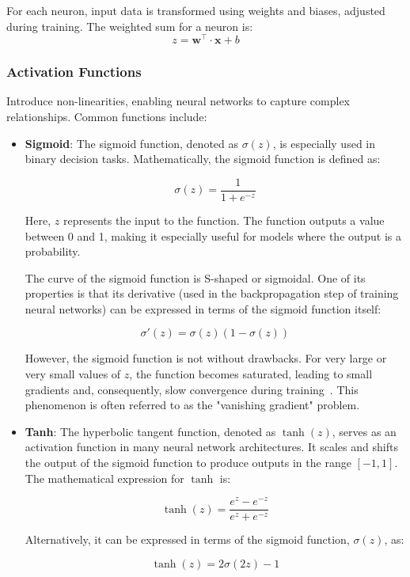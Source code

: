 For each neuron, input data is transformed using weights and biases, adjusted during training. The weighted sum for a neuron is:
\[
z = \mathbf{w^\intercal} \cdot \mathbf{x} + b
\]

\subsubsection{Activation Functions}

Introduce non-linearities, enabling neural networks to capture complex relationships. Common functions include:

\begin{itemize}
	\item \textbf{Sigmoid}: 
The sigmoid function, denoted as \( \sigma(z) \), is especially used in binary decision tasks. Mathematically, the sigmoid function is defined as:

\[
\sigma(z) = \frac{1}{1 + e^{-z}}
\]

Here, \( z \) represents the input to the function. The function outputs a value between 0 and 1, making it especially useful for models where the output is a probability. 

The curve of the sigmoid function is S-shaped or sigmoidal. One of its properties is that its derivative (used in the backpropagation step of training neural networks) can be expressed in terms of the sigmoid function itself:

\[
\sigma'(z) = \sigma(z)(1 - \sigma(z))
\]

However, the sigmoid function is not without drawbacks. For very large or very small values of \( z \), the function becomes saturated, leading to small gradients and, consequently, slow convergence during training~\cite{glorot2010understanding}. This phenomenon is often referred to as the "vanishing gradient" problem.
	
	\item \textbf{Tanh}: 
The hyperbolic tangent function, denoted as \( \tanh(z) \), serves as an activation function in many neural network architectures. It scales and shifts the output of the sigmoid function to produce outputs in the range \([-1, 1]\). The mathematical expression for \( \tanh \) is:

\[
\tanh(z) = \frac{e^{z} - e^{-z}}{e^{z} + e^{-z}}
\]

Alternatively, it can be expressed in terms of the sigmoid function, \( \sigma(z) \), as:

\[
\tanh(z) = 2\sigma(2z) - 1
\]


\end{itemize}

